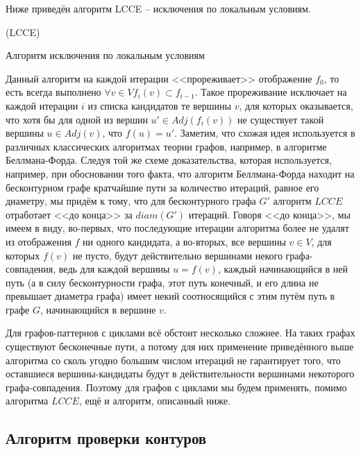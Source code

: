 Ниже приведён алгоритм LCCE -- исключения по локальным условиям.
\begin{algorithm}[H]
	\Large
	\Begin(LCCE){
	}

	\caption{Алгоритм исключения по локальным условиям}
	\label{alg:LCCE}
\end{algorithm}

Данный алгоритм на каждой итерации <<прореживает>> отображение $f_0$, то есть всегда выполнено $\forall v \in V f_{i}(v) \subset f_{i-1}$. Такое прореживание исключает на каждой итерации $i$ из списка кандидатов те вершины $v$, для которых оказывается, что хотя бы для одной из вершин $u' \in Adj(f_i(v))$ не существует такой вершины $u \in Adj(v)$, что $f(u) = u'$. Заметим, что схожая идея используется в различных классических алгоритмах теории графов, например, в алгоритме Беллмана-Форда. Следуя той же схеме доказательства, которая используется, например, при обосновании того факта, что алгоритм Беллмана-Форда находит на бесконтурном графе кратчайшие пути за количество итераций, равное его диаметру, мы придём к тому, что для бесконтурного графа $G'$ алгоритм $LCCE$ отработает <<до конца>> за $diam(G')$ итераций. Говоря <<до конца>>, мы имеем в виду, во-первых, что последующие итерации алгоритма более не удалят из отображения $f$ ни одного кандидата, а во-вторых, все вершины $v \in V$, для которых $f(v)$ не пусто, будут действительно вершинами некого графа-совпадения, ведь для каждой вершины $u = f(v)$, каждый начинающийся в ней путь (а в силу бесконтурности графа, этот путь конечный, и его длина не превышает диаметра графа) имеет некий соотносящийся с этим путём путь в графе $G$, начинающийся в вершине $v$.

Для графов-паттернов с циклами всё обстоит несколько сложнее. На таких графах существуют бесконечные пути, а потому для них применение приведённого выше алгоритма со сколь угодно большим числом итераций не гарантирует того, что оставшиеся вершины-кандидаты будут в действительности вершинами некоторого графа-совпадения. Поэтому для графов с циклами мы будем применять, помимо алгоритма $LCCE$, ещё и алгоритм, описанный ниже.

\subsection{Алгоритм проверки контуров}

